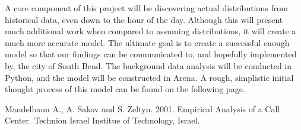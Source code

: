\documentclass[11pt,twocolumn]{article}
\begin{document}
A core component of this project will be discovering actual distributions from historical data, even down to the hour of the day.  Although this will present much additional work when compared to assuming distributions, it will create a much more accurate model.  The ultimate goal is to create a successful enough model so that our findings can be communicated to, and hopefully implemented by, the city of South Bend.  The background data analysis will be conducted in Python, and the model will be constructed in Arena.  A rough, simplistic initial thought process of this model can be found on the following page.

\begin{thebibliography}{5}

Mandelbaun A., A. Sakov and S. Zeltyn. 2001. Empirical Analysis of a Call Center. Technion Israel Institue of Technology, Israel.

\end{thebibliography}
\newpage
\clearpage

\end{document}
